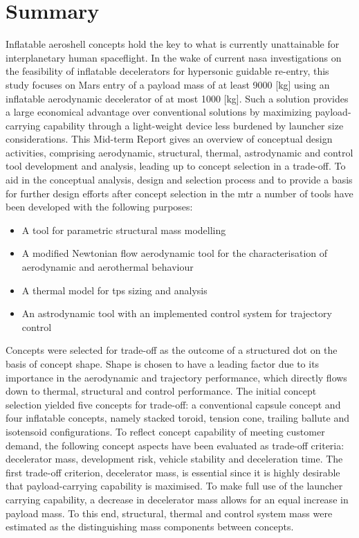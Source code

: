 \section*{Summary}\label{cha:summary}
Inflatable aeroshell concepts hold the key to what is currently unattainable for interplanetary human spaceflight. In the wake of current \acrfull{nasa} investigations on the feasibility of inflatable decelerators for hypersonic guidable re-entry, this study focuses on Mars entry of a payload mass of at least 9000 [kg] using an inflatable aerodynamic decelerator of at most 1000 [kg]. Such a solution provides a large economical advantage over conventional solutions by maximizing payload-carrying capability through a light-weight device less burdened by launcher size considerations. This Mid-term Report gives an overview of conceptual design activities, comprising aerodynamic, structural, thermal, astrodynamic and control tool development and analysis, leading up to concept selection in a trade-off.
\newline
\newline
To aid in the conceptual analysis, design and selection process and to provide a basis for further design efforts after concept selection in the \acrfull{mtr} a number of tools have been developed with the following purposes:
\begin{itemize}
\item A tool for parametric structural mass modelling
\item A modified Newtonian flow aerodynamic tool for the characterisation of aerodynamic and aerothermal behaviour
\item A thermal model for \acrfull{tps} sizing and analysis
\item An astrodynamic tool with an implemented control system for trajectory control
\end{itemize}

Concepts were selected for trade-off as the outcome of a structured \acrfull{dot} on the basis of concept shape. Shape is chosen to have a leading factor due to its importance in the aerodynamic and trajectory performance, which directly flows down to thermal, structural and control performance. The initial concept selection yielded five concepts for trade-off: a conventional capsule concept and four inflatable concepts, namely stacked toroid, tension cone, trailing ballute and isotensoid configurations. To reflect concept capability of meeting customer demand, the following concept aspects have been evaluated as trade-off criteria: decelerator mass, development risk, vehicle stability and deceleration time.
\newline
\newline
The first trade-off criterion, decelerator mass, is essential since it is highly desirable that payload-carrying capability is maximised. To make full use of the launcher carrying capability, a decrease in decelerator mass allows for an equal increase in payload mass. To this end, structural, thermal and control system mass were estimated as the distinguishing mass components between concepts. 

